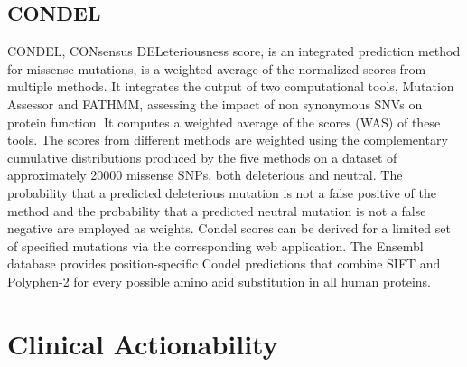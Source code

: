 \documentclass[10pt,letterpaper]{article}
\begin{document}
\subsection{CONDEL}

CONDEL, CONsensus DELeteriousness score, is an integrated prediction
method for missense mutations, is a weighted average of the normalized
scores from multiple methods. It integrates the output of two
computational tools, Mutation Assessor and FATHMM, assessing the
impact of non synonymous SNVs on protein function. It computes a
weighted average of the scores (WAS) of these tools. The scores from
different methods are weighted using the complementary cumulative
distributions produced by the five methods on a dataset of
approximately 20000 missense SNPs, both deleterious and neutral. The
probability that a predicted deleterious mutation is not a false
positive of the method and the probability that a predicted neutral
mutation is not a false negative are employed as weights. Condel
scores can be derived for a limited set of specified mutations via the
corresponding web application. The Ensembl database provides
position-specific Condel predictions that combine SIFT and Polyphen-2
for every possible amino acid substitution in all human proteins.

\section{Clinical Actionability}
\end{document}
